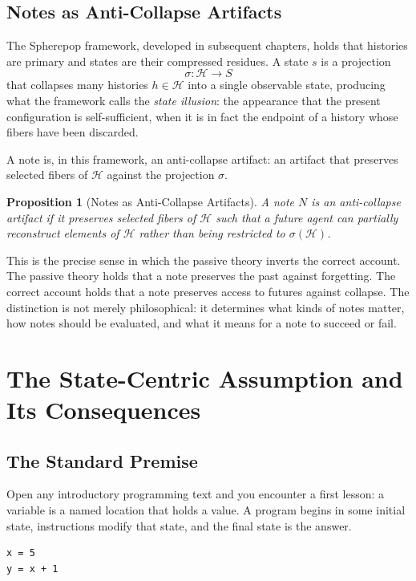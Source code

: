 \documentclass[12pt, a4paper, openany]{book}
\theoremstyle{plain}
\newtheorem{proposition}[theorem]{Proposition}
\theoremstyle{definition}
\theoremstyle{remark}
\newcommand{\calH}{\mathcal{H}}
\begin{document}
\section{Notes as Anti-Collapse Artifacts}

The Spherepop framework, developed in subsequent chapters, holds that histories
are primary and states are their compressed residues. A state $s$ is a projection
\[
\sigma : \calH \to S
\]
that collapses many histories $h \in \calH$ into a single observable state,
producing what the framework calls the \emph{state illusion}: the appearance that
the present configuration is self-sufficient, when it is in fact the endpoint of
a history whose fibers have been discarded.

A note is, in this framework, an anti-collapse artifact: an artifact that preserves
selected fibers of $\calH$ against the projection $\sigma$.

\begin{proposition}[Notes as Anti-Collapse Artifacts]
A note $N$ is an anti-collapse artifact if it preserves selected fibers of $\calH$
such that a future agent can partially reconstruct elements of $\calH$ rather than
being restricted to $\sigma(\calH)$.
\end{proposition}

This is the precise sense in which the passive theory inverts the correct account.
The passive theory holds that a note preserves the past against forgetting. The
correct account holds that a note preserves access to futures against collapse.
The distinction is not merely philosophical: it determines what kinds of notes
matter, how notes should be evaluated, and what it means for a note to succeed
or fail.

\chapter{The State-Centric Assumption and Its Consequences}

\section{The Standard Premise}

Open any introductory programming text and you encounter a first lesson: a variable
is a named location that holds a value. A program begins in some initial state,
instructions modify that state, and the final state is the answer.

\begin{lstlisting}[style=rust, caption={The standard state-centric view}]
x = 5
y = x + 1
\end{lstlisting}
\end{document}
